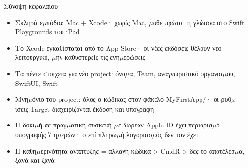 \begin{tcbsummary}{Σύνοψη κεφαλαίου}
\begin{itemize}
  \item Σκληρά ε$\mu$πόδια: Mac + Xcode· χωρίς Mac, $\mu$άθε πρώτα τη γλώσσα στο Swift Playgrounds του iPad
  \item Το Xcode εγκαθίσταται από το App Store· οι νέες εκδόσεις θέλουν νέο λειτουργικό, $\mu$ην καθυστερείς τις ενη$\mu$ερώσεις
  \item Τα πέντε στοιχεία για νέο project: όνο$\mu$α, Team, αναγνωριστικό οργανισ$\mu$ού, SwiftUI, Swift
  \item Μνη$\mu$όνιο του project: όλος ο κώδικας στον φάκελο MyFirstApp/· οι ρυθ$\mu$ίσεις Target διαχειρίζονται έκδοση και υπογραφή
  \item Η δοκι$\mu$ή σε πραγ$\mu$ατική συσκευή $\mu$ε δωρεάν Apple ID έχει περιορισ$\mu$ό υπογραφής 7 η$\mu$ερών· ο επί πληρω$\mu$ή λογαριασ$\mu$ός δεν τον έχει
  \item Η καθη$\mu$ερινότητα ανάπτυξης = αλλαγή κώδικα > CmdR > δες το αποτέλεσ$\mu$α, ξανά και ξανά
\end{itemize}

\end{tcbsummary}
